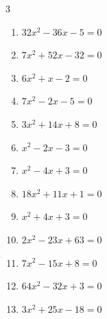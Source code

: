 \begin{multicols}{3}
\begin{enumerate}

  \item $32x^{2}-36x-5=0$


  \item $7x^{2}+52x-32=0$


  \item $6x^{2}+x-2=0$


  \item $7x^{2}-2x-5=0$


  \item $3x^{2}+14x+8=0$


  \item $x^{2}-2x-3=0$

        \phantom{$\displaystyle x=-1,\; 3$}

  \item $x^{2}-4x+3=0$

        \phantom{$\displaystyle x=3,\; 1$}

  \item $18x^{2}+11x+1=0$


\columnbreak %

  \item $x^{2}+4x+3=0$

        \phantom{$\displaystyle x=-1,\; -3$}

  \item $2x^{2}-23x+63=0$


  \item $7x^{2}-15x+8=0$


  \item $64x^{2}-32x+3=0$


  \item $3x^{2}+25x-18=0$


\end{enumerate}
\end{multicols}
